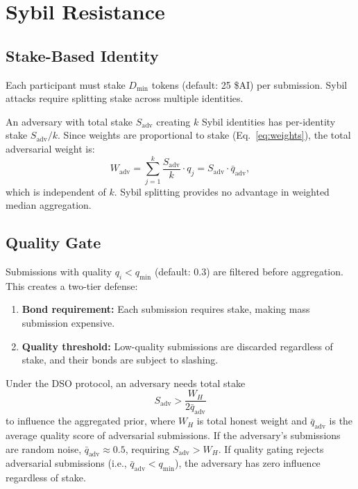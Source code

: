 \section{Sybil Resistance}

\label{sec:sybil}

\subsection{Stake-Based Identity}

Each participant must stake $D_{\min}$ tokens (default: 25 \$AI) per submission.
Sybil attacks require splitting stake across multiple identities.

\begin{proposition}
\label{prop:sybil-cost}
An adversary with total stake $S_{\text{adv}}$ creating $k$ Sybil identities
has per-identity stake $S_{\text{adv}} / k$. Since weights are proportional to
stake (Eq.~\ref{eq:weights}), the total adversarial weight is:
\begin{equation}
    W_{\text{adv}} = \sum_{j=1}^k \frac{S_{\text{adv}}}{k} \cdot q_j = S_{\text{adv}} \cdot \bar{q}_{\text{adv}},
\end{equation}
which is independent of $k$. Sybil splitting provides no advantage in weighted
median aggregation.
\end{proposition}

\subsection{Quality Gate}

Submissions with quality $q_i < q_{\min}$ (default: 0.3) are filtered before
aggregation. This creates a two-tier defense:

\begin{enumerate}[leftmargin=1.5em]
    \item \textbf{Bond requirement:} Each submission requires stake, making
          mass submission expensive.
    \item \textbf{Quality threshold:} Low-quality submissions are discarded
          regardless of stake, and their bonds are subject to slashing.
\end{enumerate}

\begin{theorem}
\label{thm:sybil}
Under the DSO protocol, an adversary needs total stake
\begin{equation}
    S_{\text{adv}} > \frac{W_H}{2 \bar{q}_{\text{adv}}}
\end{equation}
to influence the aggregated prior, where $W_H$ is total honest weight and
$\bar{q}_{\text{adv}}$ is the average quality score of adversarial submissions.
If the adversary's submissions are random noise, $\bar{q}_{\text{adv}} \approx 0.5$,
requiring $S_{\text{adv}} > W_H$. If quality gating rejects adversarial
submissions (i.e., $\bar{q}_{\text{adv}} < q_{\min}$), the adversary has zero
influence regardless of stake.
\end{theorem}

